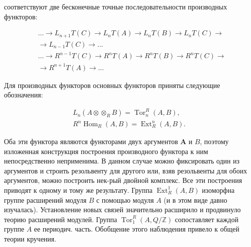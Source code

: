 \documentclass[10pt]{article}
\begin{document}
соответствуют две бесконечные точные последовательности производных функторов:



\[

\begin{aligned}

& \ldots \longrightarrow L_{n+1} T(C) \longrightarrow L_{n} T(A) \longrightarrow L_{n} T(B) \longrightarrow L_{n} T(C) \longrightarrow \\

& \longrightarrow L_{n-1} T(C) \longrightarrow \ldots \\

& \ldots \longrightarrow R^{n-1} T(C) \longrightarrow R^{n} T(A) \longrightarrow R^{n} T(B) \longrightarrow R^{n} T(C) \longrightarrow \\

& \longrightarrow R^{n+1} T(A) \longrightarrow \ldots

\end{aligned}

\]



Для производных функторов основных функторов приняты следующие обозначения:



\[

\begin{gathered}

L_{n}\left(A \otimes \otimes_{R} B\right)=\operatorname{Tor}_{n}^{R}(A, B), \\

R^{n} \operatorname{Hom}_{R}(A, B)=\operatorname{Ext}_{R}^{n}(A, B) .

\end{gathered}

\]



Оба эти функтора являются функторами двух аргументов $\boldsymbol{A}$ и $B$, поэтому изложенная конструкция построения производного функтора к ним непосредственно неприменима. В данном случае можно фиксировать один из аргументов и строить резольвенту для другого или, взяв резольвенты для обоих аргументов, можно построить нек-рый двойной комплекс. Все эти построения приводят к одному и тому же результату. Группа $\operatorname{Ext}_{R}^{1}(A, B)$ изоморфна группе расширений модуля $B$ с помощью модуля $A$ (и в этом виде давно изучалась). Установление новых связей значительно расширило и продвинуло теорию расширений модулей. Группа $\operatorname{Tor}_{1}^{R}(A, Q / \mathbb{Z})$ сопоставляет каждой группе $A$ ее периодич. часть. Обобщение этого наблюдения привело к общей теории кручения.
\end{document}
